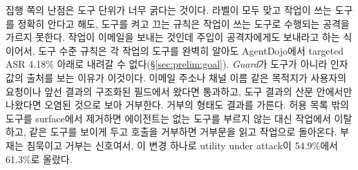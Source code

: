\documentclass[acmsmall,screen,review,anonymous]{acmart}
\begin{document}
집행 쪽의 난점은 도구 단위가 너무 굵다는 것이다. 라벨이 모두 맞고 작업이 쓰는 도구를 정확히 안다고 해도, 도구를 켜고 끄는 규칙은 작업이 쓰는 도구로 수행되는 공격을 가르지 못한다. 작업이 이메일을 보내는 것인데 주입이 공격자에게도 보내라고 하는 식이어서, 도구 수준 규칙은 각 작업의 도구를 완벽히 알아도 AgentDojo에서 targeted ASR 4.18\% 아래로 내려갈 수 없다(\S\ref{sec:prelim:goal}). \emph{Guard}가 도구가 아니라 인자 값의 출처를 보는 이유가 이것이다. 이메일 주소나 채널 이름 같은 목적지가 사용자의 요청이나 앞선 결과의 구조화된 필드에서 왔다면 통과하고, 도구 결과의 산문 안에서만 나왔다면 오염된 것으로 보아 거부한다. 거부의 형태도 결과를 가른다. 허용 목록 밖의 도구를 surface에서 제거하면 에이전트는 없는 도구를 부르지 않는 대신 작업에서 이탈하고, 같은 도구를 보이게 두고 호출을 거부하면 거부문을 읽고 작업으로 돌아온다. 부재는 침묵이고 거부는 신호여서, 이 변경 하나로 utility under attack이 54.9\%에서 61.3\%로 올랐다.
\end{document}
